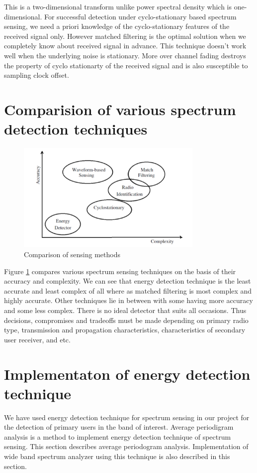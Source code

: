 This is a two-dimensional transform unlike power spectral density which is 
one-dimensional. For successful detection under cyclo-stationary based spectrum 
sensing, we need a priori knowledge of the cyclo-stationary features of the 
received signal only. However matched filtering is the optimal solution when we 
completely know about received signal in advance.
This technique doesn't work well when the underlying noise is stationary. More 
over channel fading destroys the property of cyclo stationarty of the received 
signal and is also susceptible to sampling clock offset. 


\section{Comparision of various spectrum detection techniques}


\begin{figure}[h]
\centering
\includegraphics[width=0.8\textwidth]{../images/compareSensing}
\caption[Comparison of sensing methods]{Comparison of sensing methods {\cite{kranthi13}}}
\label{compareSensing}
\end{figure}
Figure \ref{compareSensing} compares various spectrum sensing techniques on
the basis of their 
accuracy and complexity. We can see that energy detection technique is the least
accurate and least complex of all where as matched filtering is most complex and
highly accurate. Other techniques lie in between with some having more accuracy 
and some less complex. There is no ideal detector that suits all occasions. Thus
decisions, compromises and tradeoffs must be made depending on primary radio 
type, transmission and propagation characteristics, characteristics of secondary
user receiver, and etc\cite{akyildiz06}.

\section{Implementaton of energy detection technique}
We have used energy detection technique for spectrum sensing in our project for 
the detection of primary users in the band of interest. Average periodigram 
analysis is a method to implement energy detection technique of spectrum 
sensing. This section describes average periodogram analysis.  Implementation of
wide band spectrum analyzer using this technique is also described in this 
section.

